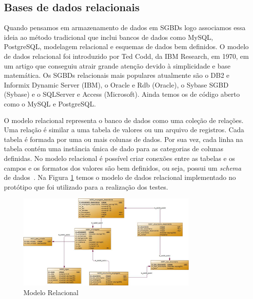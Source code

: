 \subsection{Bases de dados relacionais}

Quando pensamos em armazenamento de dados em SGBDs logo associamos essa ideia ao método tradicional que inclui bancos de dados como MySQL, PostgreSQL, modelagem relacional e esquemas de dados bem definidos. O modelo de dados relacional foi introduzido por Ted Codd, da IBM Research, em 1970, em um artigo que conseguiu atrair grande atenção devido à simplicidade e base matemática. Os SGBDs relacionais mais populares atualmente são o DB2 e Informix Dynamic Server (IBM), o Oracle e Rdb (Oracle), o Sybase SGBD (Sybase) e o SQLServer e Access (Microsoft). Ainda temos os de código aberto como o MySQL e PostgreSQL.

O modelo relacional representa o banco de dados como uma coleção de relações. Uma relação é similar a uma tabela de valores ou um arquivo de registros. Cada tabela é formada por uma ou mais colunas de dados. Por sua vez, cada linha na tabela contém uma instância única de dado para as categorias de colunas definidas. No modelo relacional é possível criar conexões entre as tabelas e os  campos e os formatos dos valores são bem definidos, ou seja, possui um \textit{schema} de dados~\cite{SBElmasri,nosqlliveup}. Na Figura \ref{fig:modelorelacional} temos o modelo de dados relacional implementado no protótipo que foi utilizado para a realização dos testes.

	\begin{figure}[!htbp]
		\begin{center}
			\includegraphics[width=0.8\textwidth]{modelo_relacional}
		\end{center}
		\caption{Modelo Relacional }
		\label{fig:modelorelacional}
	\end{figure}

